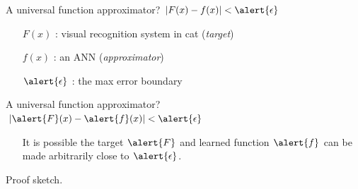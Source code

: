 \documentclass[10pt]{beamer}
\begin{document}
\begin{frame}[fragile]{A universal function approximator?}
$|F(x) - f(x)| < \alert{\epsilon}$ 
\begin{itemize}
\item[$F(x)$] : visual recognition system in cat (\textit{target})\\
\item[$f(x)$] : an ANN (\textit{approximator})
\item[$\alert{\epsilon}$] : the max error boundary
\end{itemize}
\end{frame}

\begin{frame}[fragile]{A universal function approximator?}
$|\alert{F}(x) - \alert{f}(x)| < \alert{\epsilon}$ 
\begin{itemize}
\item[] It is possible the target $\alert{F}$ and learned function $\alert{f}$ can be made arbitrarily close to $\alert{\epsilon}$.
\end{itemize}
\end{frame}


\begin{frame}[fragile]{Proof sketch.}
\end{frame}
\end{document}
